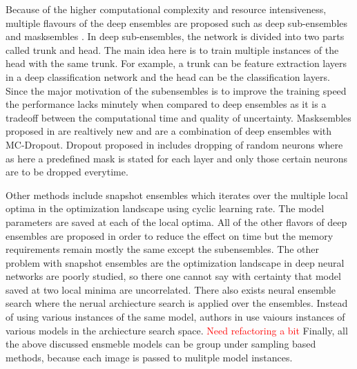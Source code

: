     Because of the higher computational complexity and resource intensiveness, multiple flavours of the deep ensembles are proposed such as deep sub-ensembles \cite{deep_subensembles} and masksembles \cite{masksembles}.
    In deep sub-ensembles, the network is divided into two parts called trunk and head.
    The main idea here is to train multiple instances of the head with the same trunk. For example, a trunk can be feature extraction layers in a deep classification network and the head can be the classification layers.
    Since the major motivation of the subensembles is to improve the training speed the performance lacks minutely when compared to deep ensembles as it is a tradeoff between the computational time and quality of uncertainty.
    Masksembles proposed in \cite{masksembles} are realtively new and are a combination of deep ensembles with MC-Dropout.
    Dropout proposed in \cite{Dropout} includes dropping of random neurons where as here a predefined mask is stated for each layer and only those certain neurons are to be dropped everytime.

    Other methods include snapshot ensembles \cite{snapshot_ensembles} which iterates over the multiple local optima in the optimization landscape using cyclic learning rate. 
    The model parameters are saved at each of the local optima. 
    All of the other flavors of deep ensembles are proposed in order to reduce the effect on time but the memory requirements remain mostly the same except the subensembles.
    The other problem with snapshot ensembles are the optimization landscape in deep neural networks are poorly studied, so there one cannot say with certainty that model saved at two local minima are uncorrelated.
    There also exists neural ensemble search \cite{NAS_Ensembles} where the nerual archiecture search is applied over the ensembles.
    Instead of using various instances of the same model, authors in \cite{NAS_Ensembles} use vaiours instances of various models in the archiecture search space.
    \textcolor{red}{Need refactoring a bit}
    Finally, all the above discussed ensmeble models can be group under sampling based methods, because each image is passed to mulitple model instances.    


